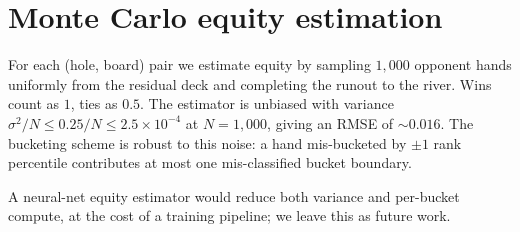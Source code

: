 \section{Monte Carlo equity estimation}
\label{app:equity}

For each (hole, board) pair we estimate equity by sampling $1{,}000$
opponent hands uniformly from the residual deck and completing the runout
to the river. Wins count as $1$, ties as $0.5$. The estimator is unbiased
with variance $\sigma^2 / N \leq 0.25 / N \leq 2.5 \times 10^{-4}$ at
$N = 1{,}000$, giving an RMSE of $\sim 0.016$. The bucketing scheme is
robust to this noise: a hand mis-bucketed by $\pm 1$ rank percentile
contributes at most one mis-classified bucket boundary.

A neural-net equity estimator would reduce both variance and per-bucket
compute, at the cost of a training pipeline; we leave this as future work.
